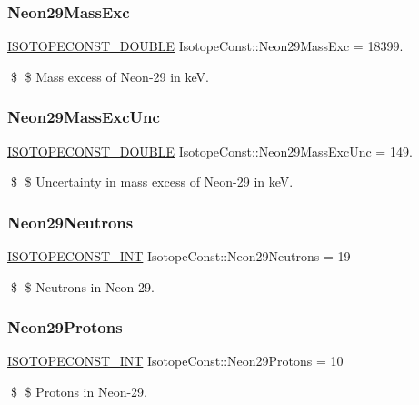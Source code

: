 \subsubsection{\texorpdfstring{Neon29\+Mass\+Exc}{Neon29MassExc}}
{\footnotesize\ttfamily \mbox{\hyperlink{group___isotope_const-_macros_ga8f45a7272ce02c0b4c65c44636ed719a}{I\+S\+O\+T\+O\+P\+E\+C\+O\+N\+S\+T\+\_\+\+D\+O\+U\+B\+LE}} Isotope\+Const\+::\+Neon29\+Mass\+Exc = 18399.}

\$ \$ Mass excess of Neon-\/29 in keV. \mbox{\label{group___isotope_const-_neon-_ne29_gad6cee212302aeab562231d26b8897e17}} 
\subsubsection{\texorpdfstring{Neon29\+Mass\+Exc\+Unc}{Neon29MassExcUnc}}
{\footnotesize\ttfamily \mbox{\hyperlink{group___isotope_const-_macros_ga8f45a7272ce02c0b4c65c44636ed719a}{I\+S\+O\+T\+O\+P\+E\+C\+O\+N\+S\+T\+\_\+\+D\+O\+U\+B\+LE}} Isotope\+Const\+::\+Neon29\+Mass\+Exc\+Unc = 149.}

\$ \$ Uncertainty in mass excess of Neon-\/29 in keV. \mbox{\label{group___isotope_const-_neon-_ne29_ga4640af8fbe636703364fdf23216db66e}} 
\subsubsection{\texorpdfstring{Neon29\+Neutrons}{Neon29Neutrons}}
{\footnotesize\ttfamily \mbox{\hyperlink{group___isotope_const-_macros_ga5f18360b3e99483a35c32d789e62621c}{I\+S\+O\+T\+O\+P\+E\+C\+O\+N\+S\+T\+\_\+\+I\+NT}} Isotope\+Const\+::\+Neon29\+Neutrons = 19}

\$ \$ Neutrons in Neon-\/29. \mbox{\label{group___isotope_const-_neon-_ne29_gac503371b6f7fde64ef381c4a90723dc0}} 
\subsubsection{\texorpdfstring{Neon29\+Protons}{Neon29Protons}}
{\footnotesize\ttfamily \mbox{\hyperlink{group___isotope_const-_macros_ga5f18360b3e99483a35c32d789e62621c}{I\+S\+O\+T\+O\+P\+E\+C\+O\+N\+S\+T\+\_\+\+I\+NT}} Isotope\+Const\+::\+Neon29\+Protons = 10}

\$ \$ Protons in Neon-\/29. 